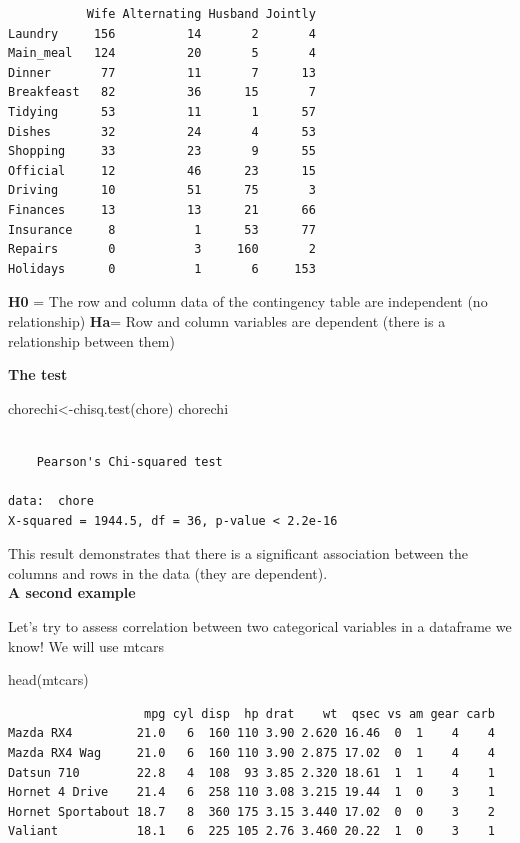 \documentclass[
  letterpaper,
  DIV=11,
  numbers=noendperiod]{scrartcl}
\newenvironment{Shaded}{\begin{snugshade}}{\end{snugshade}}
\newcommand{\FunctionTok}[1]{\textcolor[rgb]{0.28,0.35,0.67}{#1}}
\newcommand{\NormalTok}[1]{\textcolor[rgb]{0.00,0.23,0.31}{#1}}
\newcommand{\OtherTok}[1]{\textcolor[rgb]{0.00,0.23,0.31}{#1}}
\begin{document}
\begin{verbatim}
           Wife Alternating Husband Jointly
Laundry     156          14       2       4
Main_meal   124          20       5       4
Dinner       77          11       7      13
Breakfeast   82          36      15       7
Tidying      53          11       1      57
Dishes       32          24       4      53
Shopping     33          23       9      55
Official     12          46      23      15
Driving      10          51      75       3
Finances     13          13      21      66
Insurance     8           1      53      77
Repairs       0           3     160       2
Holidays      0           1       6     153
\end{verbatim}

\textbf{H0} = The row and column data of the contingency table are
independent (no relationship) \textbf{Ha}= Row and column variables are
dependent (there is a relationship between them)

\textbf{The test}

\begin{Shaded}
\begin{Highlighting}[]
\NormalTok{chorechi}\OtherTok{\textless{}{-}}\FunctionTok{chisq.test}\NormalTok{(chore)}
\NormalTok{chorechi}
\end{Highlighting}
\end{Shaded}

\begin{verbatim}

    Pearson's Chi-squared test

data:  chore
X-squared = 1944.5, df = 36, p-value < 2.2e-16
\end{verbatim}

This result demonstrates that there is a significant association between
the columns and rows in the data (they are dependent).\\

\textbf{A second example}

Let's try to assess correlation between two categorical variables in a
dataframe we know! We will use mtcars

\begin{Shaded}
\begin{Highlighting}[]
\FunctionTok{head}\NormalTok{(mtcars)}
\end{Highlighting}
\end{Shaded}

\begin{verbatim}
                   mpg cyl disp  hp drat    wt  qsec vs am gear carb
Mazda RX4         21.0   6  160 110 3.90 2.620 16.46  0  1    4    4
Mazda RX4 Wag     21.0   6  160 110 3.90 2.875 17.02  0  1    4    4
Datsun 710        22.8   4  108  93 3.85 2.320 18.61  1  1    4    1
Hornet 4 Drive    21.4   6  258 110 3.08 3.215 19.44  1  0    3    1
Hornet Sportabout 18.7   8  360 175 3.15 3.440 17.02  0  0    3    2
Valiant           18.1   6  225 105 2.76 3.460 20.22  1  0    3    1
\end{verbatim}
\end{document}
